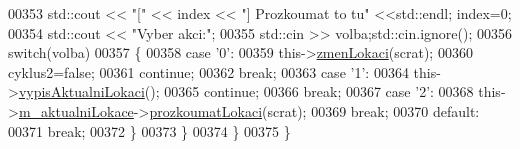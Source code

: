 \begin{DoxyCode}
00353             std::cout << \textcolor{stringliteral}{"["} << index << \textcolor{stringliteral}{"] Prozkoumat to tu"} <<std::endl; index=0;
00354             std::cout << \textcolor{stringliteral}{"Vyber akci:"};
00355             std::cin >> volba;std::cin.ignore();
00356             \textcolor{keywordflow}{switch}(volba)
00357             \{
00358                 \textcolor{keywordflow}{case} \textcolor{charliteral}{'0'}:
00359                     this->\hyperlink{classIceAge_1_1Hra_a9429d4476f187d8a80dde5944704fab7}{zmenLokaci}(scrat);
00360                     cyklus2=\textcolor{keyword}{false};
00361                     \textcolor{keywordflow}{continue};
00362                     \textcolor{keywordflow}{break};
00363                 \textcolor{keywordflow}{case} \textcolor{charliteral}{'1'}:
00364                     this->\hyperlink{classIceAge_1_1Hra_af0fafa4884c5107939edc907cc7de1a9}{vypisAktualniLokaci}();
00365                     \textcolor{keywordflow}{continue};
00366                     \textcolor{keywordflow}{break};
00367                 \textcolor{keywordflow}{case} \textcolor{charliteral}{'2'}:
00368                     this->\hyperlink{classIceAge_1_1Hra_a2d006812c29f093c47054be30c8b7591}{m\_aktualniLokace}->\hyperlink{classIceAge_1_1Lokace_a901ef2b29b32b8698115e8a2fe65df02}{prozkoumatLokaci}(scrat);
00369                     \textcolor{keywordflow}{break};
00370                 \textcolor{keywordflow}{default}:
00371                     \textcolor{keywordflow}{break};
00372             \}
00373         \}
00374     \}
00375 \}
\end{DoxyCode}
